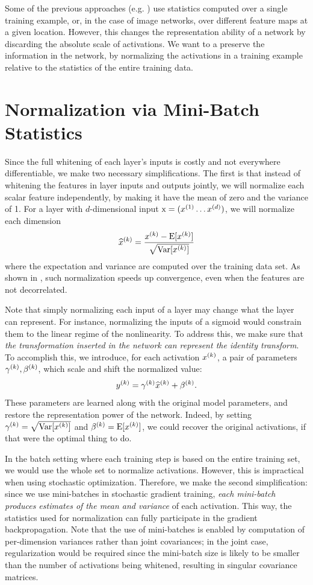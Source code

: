 \documentclass[twocolumn]{article}
\begin{document}

Some of the previous approaches
(e.g. \cite{lyu-simoncelli}) use statistics computed over a single
training example, or, in the case of image networks, over different
feature maps at a given location. However, this changes the
representation ability of a network by discarding the absolute scale
of activations. We want to a preserve the information in the network,
by normalizing the activations in a training example relative to the
statistics of the entire training data.

\section{Normalization via Mini-Batch Statistics}


Since the full whitening of each layer's inputs is costly and not
everywhere differentiable, we make two necessary simplifications. The first
 is that instead of whitening the features in layer
inputs and outputs jointly, we will normalize each scalar feature
independently, by making it have the mean of zero and the variance of
1. For a layer with $d$-dimensional input $\mathrm{x} = (x^{(1)}\ldots x^{(d)})$, we
will normalize each dimension 
$$\widehat{x}^{(k)} = \frac{x^{(k)}-\text{E}[x^{(k)}]}{
  \sqrt{\text{Var}[x^{(k)}]}}$$
where the expectation and variance are
computed over the training data set. As shown in
\cite{lecun-backprop}, such normalization speeds up convergence,
even when the  features are not decorrelated.


Note that simply normalizing each input of a layer may change what the
layer can represent. For instance, normalizing the inputs of a
sigmoid would constrain them to the linear
regime of the nonlinearity. To address this, we make sure that {\em the transformation inserted in
  the network can represent the identity transform}.  To
accomplish this, we introduce, for each activation $x^{(k)}$, a pair of
parameters $\gamma^{(k)}, \beta^{(k)}$, which scale and shift the
normalized value: $$y^{(k)} = \gamma^{(k)}\widehat{x}^{(k)} +
\beta^{(k)}.$$ These parameters are learned along with the original model
parameters, and restore the representation power of the
network. Indeed, by setting $\gamma^{(k)} = \sqrt{\text{Var}[x^{(k)}]}$ and
$\beta^{(k)} = \text{E}[x^{(k)}]$, we could recover the original activations, if that were the optimal thing to do.

In the batch setting where each training step is based on the entire training
set, we would use the whole set to normalize activations. However, this is
impractical when using stochastic optimization. Therefore, we make the second
simplification: since we use mini-batches in stochastic gradient training, {\em
  each mini-batch produces estimates of the mean and variance} of each
activation. This way, the statistics used for normalization can fully
participate in the gradient backpropagation.
Note that the use of mini-batches is enabled by computation of
per-dimension variances rather than joint covariances; in the joint case,
regularization would be required since the mini-batch size is likely to be
smaller than the number of activations being whitened, resulting in singular
covariance matrices.
\end{document}
